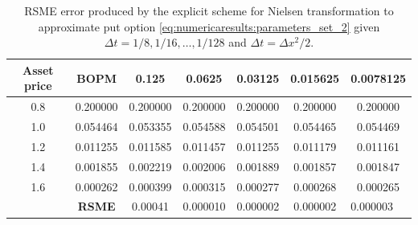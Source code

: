 \begin{table}[H]
  \centering
  \begin{tabular}{@{}ccccccc@{}}
  \toprule
  \textbf{Asset price} & \textbf{BOPM} & 0.125    & 0.0625   & 0.03125  & 0.015625 & 0.0078125                    \\ \midrule
  0.8                  & 0.200000      & 0.200000 & 0.200000 & 0.200000 & 0.200000 & 0.200000                     \\
  1.0                  & 0.054464      & 0.053355 & 0.054588 & 0.054501 & 0.054465 & 0.054469                     \\
  1.2                  & 0.011255      & 0.011585 & 0.011457 & 0.011255 & 0.011179 & 0.011161                     \\
  1.4                  & 0.001855      & 0.002219 & 0.002006 & 0.001889 & 0.001857 & 0.001847                     \\
  1.6                  & 0.000262      & 0.000399 & 0.000315 & 0.000277 & 0.000268 & 0.000265                     \\
                       & \textbf{RSME} & 0.00041  & 0.000010 & 0.000002 & 0.000002 & \multicolumn{1}{l}{0.000003} \\ \bottomrule
  \end{tabular}
  \caption{\label{tab:rsme_explicit_company_transformation_put}RSME error produced by the explicit scheme for Nielsen transformation to approximate put option \eqref{eq:numericaresults:parameters_set_2} given $\Delta{t}=1/8,1/16,\dots,1/128$ and $\Delta{t}=\Delta{x}^2/2$.}
  \end{table}

